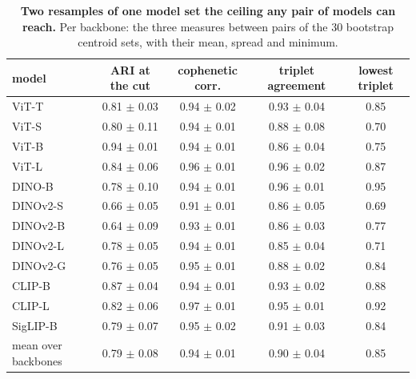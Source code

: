 \begin{table}[H]
\centering
\scriptsize
\setlength{\tabcolsep}{3pt}
\begingroup
\footnotesize
\setlength{\tabcolsep}{4pt}
\begin{tabular}{lccc|c}
\toprule
model & ARI at the cut & cophenetic corr. & triplet agreement & lowest triplet \\
\midrule
ViT-T & 0.81 $\pm$ 0.03 & 0.94 $\pm$ 0.02 & 0.93 $\pm$ 0.04 & 0.85 \\
ViT-S & 0.80 $\pm$ 0.11 & 0.94 $\pm$ 0.01 & 0.88 $\pm$ 0.08 & 0.70 \\
ViT-B & 0.94 $\pm$ 0.01 & 0.94 $\pm$ 0.01 & 0.86 $\pm$ 0.04 & 0.75 \\
ViT-L & 0.84 $\pm$ 0.06 & 0.96 $\pm$ 0.01 & 0.96 $\pm$ 0.02 & 0.87 \\
\midrule
DINO-B & 0.78 $\pm$ 0.10 & 0.94 $\pm$ 0.01 & 0.96 $\pm$ 0.01 & 0.95 \\
DINOv2-S & 0.66 $\pm$ 0.05 & 0.91 $\pm$ 0.01 & 0.86 $\pm$ 0.05 & 0.69 \\
DINOv2-B & 0.64 $\pm$ 0.09 & 0.93 $\pm$ 0.01 & 0.86 $\pm$ 0.03 & 0.77 \\
DINOv2-L & 0.78 $\pm$ 0.05 & 0.94 $\pm$ 0.01 & 0.85 $\pm$ 0.04 & 0.71 \\
DINOv2-G & 0.76 $\pm$ 0.05 & 0.95 $\pm$ 0.01 & 0.88 $\pm$ 0.02 & 0.84 \\
\midrule
CLIP-B & 0.87 $\pm$ 0.04 & 0.94 $\pm$ 0.01 & 0.93 $\pm$ 0.02 & 0.88 \\
CLIP-L & 0.82 $\pm$ 0.06 & 0.97 $\pm$ 0.01 & 0.95 $\pm$ 0.01 & 0.92 \\
SigLIP-B & 0.79 $\pm$ 0.07 & 0.95 $\pm$ 0.02 & 0.91 $\pm$ 0.03 & 0.84 \\
\midrule
mean over backbones & 0.79 $\pm$ 0.08 & 0.94 $\pm$ 0.01 & 0.90 $\pm$ 0.04 & 0.85 \\
\bottomrule
\end{tabular}
\par\vspace{2pt}
\endgroup
\caption{\textbf{Two resamples of one model set the ceiling any pair of models can reach.} Per backbone: the three measures between pairs of the 30 bootstrap centroid sets, with their mean, spread and minimum.
}
\label{tab:q6-treemap-c}
\end{table}
